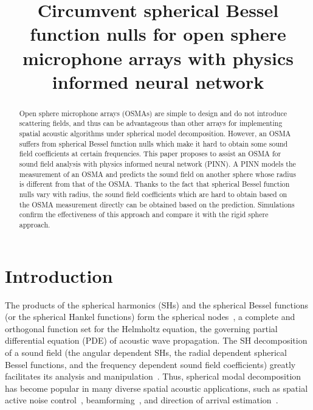 \documentclass[11pt]{article}
\title{Circumvent spherical Bessel function nulls for open sphere 
microphone arrays with physics informed neural network}
\begin{document}
\maketitle
\begin{abstract}
Open sphere microphone arrays (OSMAs) are simple to design and do not introduce 
scattering fields, and thus can be advantageous than other arrays for  
implementing spatial acoustic algorithms under spherical model decomposition.
However, an OSMA suffers from spherical Bessel function nulls which 
make it hard to obtain some sound field coefficients at certain frequencies. 
This paper proposes to assist an OSMA for sound field analysis with 
physics informed neural network (PINN).
A PINN models the measurement of an OSMA and predicts the sound field on 
another sphere whose radius is different from that of the OSMA. 
Thanks to the fact that spherical Bessel function nulls vary with radius, 
the sound field coefficients which are hard to obtain based on the OSMA 
measurement directly can be obtained based on the prediction. 
Simulations confirm the effectiveness of this approach and compare 
it with the rigid sphere approach. 
\end{abstract}




\section{Introduction}
The products of the spherical harmonics (SHs) and the spherical Bessel functions 
(or the spherical Hankel functions) form the spherical nodes~\cite{williams2000fourier}, 
a complete and orthogonal function set for the Helmholtz equation, the governing partial 
differential equation (PDE) of acoustic wave propagation. 
The SH decomposition of a sound field  (the 
angular dependent SHs, the radial dependent spherical Bessel functions, and the 
frequency dependent sound field coefficients) greatly facilitates its analysis 
and manipulation~\cite{williams2000fourier,thushara_near_1999,Rafaely2015}.
Thus, spherical modal decomposition has become popular in many diverse spatial 
acoustic applications, such as spatial active noise control~\cite{Wen_2018,ma2018active,Fei_2020},
beamforming~\cite{5745011,Rafaely2015,huang2018insights}, 
and direction of arrival estimation~\cite{moore2016direction, 
hafezi2017augmented,jo2019parametric}.
\end{document}

